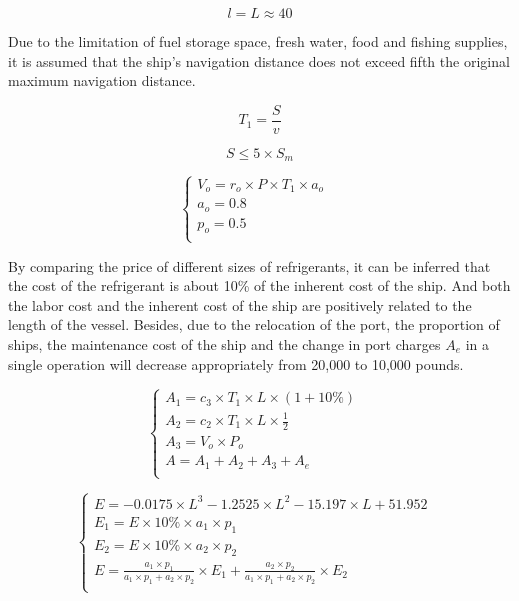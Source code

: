 \documentclass{mcmthesis}
\begin{document}
\begin{equation}\label{4}
l=L\approx 40
\end{equation}

Due to the limitation of fuel storage space, fresh water, food and fishing supplies, it is assumed that the ship's navigation distance does not exceed fifth the original maximum navigation distance.

\begin{equation}\label{4}
T_1=\frac{S}{v}
\end{equation}

\begin{equation}\label{4}
S \leq 5\times S_m
\end{equation}

\begin{equation}
\left\{
\begin{array}{lr}
V_o=r_o \times P \times T_1 \times a_o &\\
a_o=0.8  & \\    p_o=0.5 \\
\end{array}
\right.
\end{equation}

By comparing the price of different sizes of refrigerants, it can be inferred that the cost of the refrigerant is about 10\% of the inherent cost of the ship. And both the labor cost and the inherent cost of the ship are positively related to the length of the vessel. Besides, due to the relocation of the port, the proportion of ships, the maintenance cost of the ship and the change in port charges $A_e$ in a single operation will decrease appropriately from 20,000 to 10,000 pounds. 

			\begin{equation}
			\left\{
			\begin{array}{lr}

A_1=c_3 \times T_1\times L \times (1+10\%) &\\
A_2=c_2  \times T_1 \times L \times  \frac{1}{2} &\\
A_3=V_o  \times P_o &\\
A=A_1+A_2+A_3+A_e \\		
			\end{array}
			\right.
			\end{equation}



\begin{equation}
\left\{
\begin{array}{lr}
E= -0.0175\times L^3 -1.2525\times L^2 - 15.197 \times L+ 51.952&\\
E_1=E \times 10\% \times a_1 \times p_1 &\\
E_2=E\times 10\% \times a_2 \times p_2 &\\
E= \frac{a_1 \times p_1}{a_1 \times p_1+ a_2 \times p_2} \times E_1 + \frac{a_2 \times p_2}{a_1 \times p_1+ a_2 \times p_2} \times E_2\\

\end{array}
\right.
\end{equation}
\end{document}
